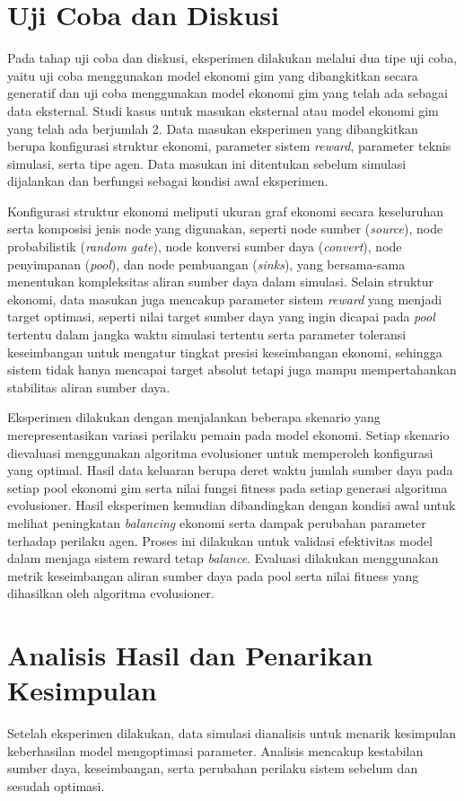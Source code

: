 \section{Uji Coba dan Diskusi}
Pada tahap uji coba dan diskusi, eksperimen dilakukan melalui dua tipe uji coba, yaitu uji coba menggunakan model ekonomi gim yang dibangkitkan secara generatif dan uji coba menggunakan model ekonomi gim yang telah ada sebagai data eksternal. Studi kasus untuk masukan eksternal atau model ekonomi gim yang telah ada berjumlah 2.
Data masukan eksperimen yang dibangkitkan berupa konfigurasi struktur ekonomi, parameter sistem \textit{reward}, parameter teknis simulasi, serta tipe agen. Data masukan ini ditentukan sebelum simulasi dijalankan dan berfungsi sebagai kondisi awal eksperimen.

Konfigurasi struktur ekonomi meliputi ukuran graf ekonomi secara keseluruhan serta komposisi jenis node yang digunakan, seperti node sumber (\textit{source}), node probabilistik (\textit{random gate}), node konversi sumber daya (\textit{convert}), node penyimpanan (\textit{pool}), dan node pembuangan (\textit{sinks}), yang bersama-sama menentukan kompleksitas aliran sumber daya dalam simulasi. Selain struktur ekonomi, data masukan juga mencakup parameter sistem \textit{reward} yang menjadi target optimasi, seperti nilai target sumber daya yang ingin dicapai pada \textit{pool} tertentu dalam jangka waktu simulasi tertentu serta parameter toleransi keseimbangan untuk mengatur tingkat presisi keseimbangan ekonomi, sehingga sistem tidak hanya mencapai target absolut tetapi juga mampu mempertahankan stabilitas aliran sumber daya.

Eksperimen dilakukan dengan menjalankan beberapa skenario yang merepresentasikan variasi perilaku pemain pada model ekonomi. Setiap skenario dievaluasi menggunakan algoritma evolusioner untuk memperoleh konfigurasi yang optimal. Hasil data keluaran berupa deret waktu jumlah sumber daya pada setiap pool ekonomi gim serta nilai fungsi fitness pada setiap generasi algoritma evolusioner. Hasil eksperimen kemudian dibandingkan dengan kondisi awal untuk melihat peningkatan \textit{balancing} ekonomi serta dampak perubahan parameter terhadap perilaku agen. Proses ini dilakukan untuk validasi efektivitas model dalam menjaga sistem reward tetap \textit{balance}. Evaluasi dilakukan menggunakan metrik keseimbangan 
aliran sumber daya pada pool serta nilai fitness yang 
dihasilkan oleh algoritma evolusioner.

\section{Analisis Hasil dan Penarikan Kesimpulan}
Setelah eksperimen dilakukan, data simulasi dianalisis untuk menarik kesimpulan keberhasilan model mengoptimasi parameter. Analisis mencakup kestabilan sumber daya, keseimbangan, serta perubahan perilaku sistem sebelum dan sesudah optimasi.


